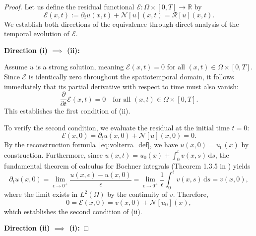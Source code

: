 \documentclass[11pt,reqno]{amsart}
\theoremstyle{plain}
\theoremstyle{definition}
\theoremstyle{remark}
\begin{document}
\begin{proof}
Let us define the residual functional $\mathcal{E}: \Omega \times [0, T] \to \mathbb{R}$ by
\begin{equation}
    \mathcal{E}(x,t) := \partial_t u(x,t) + \mathcal{N}[u](x,t) = \mathcal{R}[u](x,t).
\end{equation}
We establish both directions of the equivalence through direct analysis of the temporal evolution of $\mathcal{E}$.

\medskip
\noindent\textbf{Direction (i) $\implies$ (ii):} 

\noindent Assume $u$ is a strong solution, meaning $\mathcal{E}(x,t) = 0$ for all $(x,t) \in \Omega \times [0, T]$. Since $\mathcal{E}$ is identically zero throughout the spatiotemporal domain, it follows immediately that its partial derivative with respect to time must also vanish:
\begin{equation}
    \frac{\partial}{\partial t} \mathcal{E}(x,t) = 0 \quad \text{for all } (x,t) \in \Omega \times [0,T].
\end{equation}
This establishes the first condition of (ii). 

\noindent To verify the second condition, we evaluate the residual at the initial time $t=0$:
\begin{equation}
    \mathcal{E}(x,0) = \partial_t u(x,0) + \mathcal{N}[u](x,0) = 0.
\end{equation}
By the reconstruction formula~\eqref{eq:volterra_def}, we have $u(x,0) = u_0(x)$ by construction. Furthermore, since $\displaystyle u(x,t) = u_0(x) + \int_0^t v(x,s) \, \mathrm{d}s$, the fundamental theorem of calculus for Bochner integrals (Theorem 1.3.5 in \cite{brezis2011}) yields
\begin{equation}
    \partial_t u(x,0) = \lim_{\epsilon \to 0^+} \frac{u(x,\epsilon) - u(x,0)}{\epsilon} = \lim_{\epsilon \to 0^+} \frac{1}{\epsilon}\int_0^\epsilon v(x,s) \, \mathrm{d}s = v(x,0),
\end{equation}
where the limit exists in $L^2(\Omega)$ by the continuity of $v$. Therefore,
\begin{equation}
    0 = \mathcal{E}(x,0) = v(x,0) + \mathcal{N}[u_0](x),
\end{equation}
which establishes the second condition of (ii).

\medskip
\noindent\textbf{Direction (ii) $\implies$ (i):} 


\end{proof}
\end{document}
